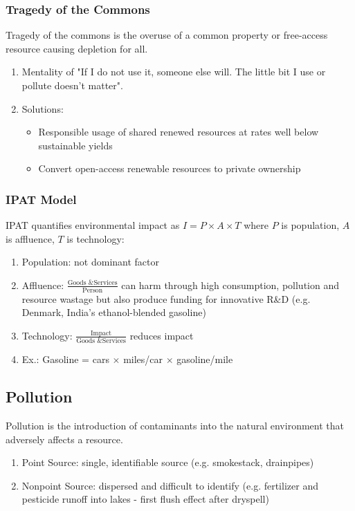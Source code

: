 \documentclass[12pt, a4paper]{article}
\begin{document}
\begin{multicols*}{3}
\subsubsection{Tragedy of the Commons}

Tragedy of the commons is the overuse of a common property or free-access resource causing depletion for all.
\begin{enumerate}[\roman*.]
  \item Mentality of "If I do not use it, someone else will. The little bit I use or pollute doesn't matter".
  \item Solutions:
    \begin{itemize}[leftmargin=*]\vspace{2pt}
      \item Responsible usage of shared renewed resources at rates well below sustainable yields
      \item Convert open-access renewable resources to private ownership
    \end{itemize}
\end{enumerate}

\colbreak
\subsubsection{IPAT Model}
IPAT quantifies environmental impact as $I = P \times A \times T$
where $P$ is population, $A$ is affluence, $T$ is technology:
\begin{enumerate}[\roman*.]
  \item Population: not dominant factor 
  \item Affluence: $\displaystyle\frac{\text{Goods \& Services}}{\text{Person}}$ can harm through high consumption, pollution and resource wastage but also produce funding for innovative R\&D (e.g. Denmark, India's ethanol-blended gasoline)
  \item Technology: $\displaystyle\frac{\text{Impact}}{\text{Goods \& Services}}$ reduces impact 
  \item Ex.: Gasoline = cars $\times$ miles/car $\times$ gasoline/mile
\end{enumerate}

\subsection{Pollution}
Pollution is the introduction of contaminants into the natural environment that adversely affects a resource. 
\begin{enumerate}[\roman*.]
  \item Point Source: single, identifiable source (e.g. smokestack, drainpipes)
  \item Nonpoint Source: dispersed and difficult to identify (e.g. fertilizer and pesticide runoff into lakes - first flush effect after dryspell)
\end{enumerate}


\end{multicols*}
\end{document}
